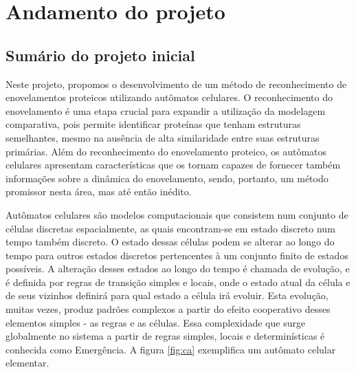 \chapter{Andamento do projeto}\label{ch:introducao}
\section{Sumário do projeto inicial}
Neste projeto, propomos o desenvolvimento de um método de reconhecimento de enovelamentos proteicos utilizando autômatos celulares. O reconhecimento do enovelamento é uma etapa crucial para expandir a utilização da modelagem comparativa, pois permite identificar proteínas que tenham estruturas semelhantes, mesmo na ausência de alta similaridade entre suas estruturas primárias. Além do reconhecimento do enovelamento proteico, os autômatos celulares apresentam características que os tornam capazes de fornecer também informações sobre a dinâmica do enovelamento, sendo, portanto, um método promissor nesta área, mas até então inédito.

Autômatos celulares são modelos computacionais que consistem num conjunto de células discretas espacialmente, as quais encontram-se em estado discreto num tempo também discreto. O estado dessas células podem se alterar ao longo do tempo para outros estados discretos pertencentes à um conjunto finito de estados possíveis. A alteração desses estados ao longo do tempo é chamada de evolução, e é definida por regras de transição simples e locais, onde o estado atual da célula e de seus vizinhos definirá para qual estado a célula irá evoluir. Esta evolução, muitas vezes, produz padrões complexos a partir do efeito cooperativo desses elementos simples - as regras e as células. Essa complexidade que surge globalmente no sistema a partir de regras simples, locais e determinísticas é conhecida como Emergência. A figura \ref{fig:ca} exemplifica um autômato celular elementar. 


